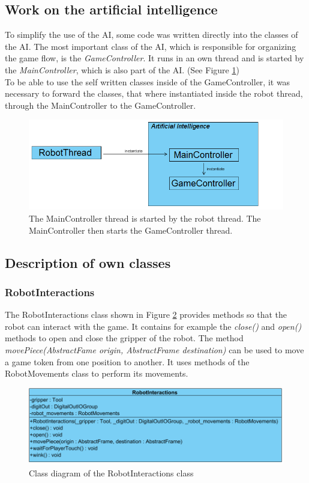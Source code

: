 \documentclass[a4paper]{spie}  %
\begin{document}
\begin{large}
\subsection{Work on the artificial intelligence}
To simplify the use of the AI, some code was written directly into the classes of the AI. The most important class of the AI, which is responsible for organizing the game flow, is the \emph{GameController}. It runs in an own thread and is started by the \emph{MainController}, which is also part of the AI. (See Figure \ref{thread_diagram})\\
To be able to use the self written classes inside of the GameController, it was necessary to forward the classes, that where instantiated inside the robot thread, through the MainController to the GameController.
\begin{figure}[h]
\includegraphics[width=15cm]{images/diagram.png}
\centering
\caption{The MainController thread is started by the robot thread. The MainController then starts the GameController thread.}
\label{thread_diagram}
\end{figure}
\subsection{Description of own classes}
\subsubsection{RobotInteractions}
The RobotInteractions class shown in Figure \ref{class_roboInt} provides methods so that the robot can interact with the game. It contains for example the \emph{close()} and \emph{open()} methods to open and close the gripper of the robot. The method \emph{movePiece(AbstractFame origin, AbstractFrame destination)} can be used to move a game token from one position to another. It uses methods of the RobotMovements class to perform its movements.
\begin{figure}[h]
\includegraphics[width=15cm]{images/class_roboInt.png}
\centering
\caption{Class diagram of the RobotInteractions class}
\label{class_roboInt}
\end{figure}


\end{large}
\end{document}
